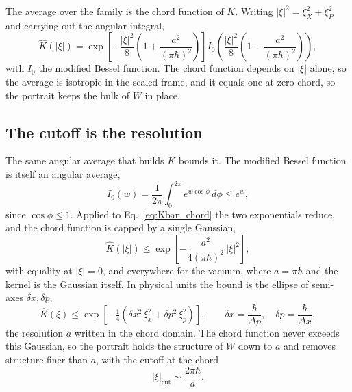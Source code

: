 \documentclass[%
  aps, amsmath, amssymb, onecolumn, 11pt
]{revtex4-2}
\begin{document}
The average over the family is the chord function of $K$. Writing
$|\xi|^2 = \xi_X^2 + \xi_P^2$ and carrying out the angular integral,
\begin{equation}
\widehat{K}(|\xi|)
= \exp\!\left[-\frac{|\xi|^2}{8}\!
\left(1 + \frac{a^2}{(\pi\hbar)^2}\right)\right]
I_0\!\left(\frac{|\xi|^2}{8}\!
\left(1 - \frac{a^2}{(\pi\hbar)^2}\right)\right),
\label{eq:Kbar_chord}
\end{equation}
with $I_0$ the modified Bessel function. The chord function depends on
$|\xi|$ alone, so the average is isotropic in the scaled frame, and it
equals one at zero chord, so the portrait keeps the bulk of $W$ in place.

\subsection{The cutoff is the resolution}
\label{sec:cutoff}

The same angular average that builds $K$ bounds it. The modified
Bessel function is itself an angular average,
\begin{equation}
I_0(w) = \frac{1}{2\pi}\int_0^{2\pi} e^{w\cos\phi}\,d\phi \le e^{w},
\label{eq:bessel_bound}
\end{equation}
since $\cos\phi \le 1$. Applied to Eq.~\eqref{eq:Kbar_chord} the two
exponentials reduce, and the chord function is capped by a single
Gaussian,
\begin{equation}
\widehat{K}(|\xi|) \le
\exp\!\left[-\frac{a^2}{4(\pi\hbar)^2}\,|\xi|^2\right],
\label{eq:Kbar_bound}
\end{equation}
with equality at $|\xi| = 0$, and everywhere for the vacuum, where
$a = \pi\hbar$ and the kernel is the Gaussian itself. In physical
units the bound is the ellipse of semi-axes $\delta x, \delta p$,
\begin{equation}
\widehat{K}(\xi) \le
\exp\!\left[-\tfrac14\!\left(\delta x^2\,\xi_x^2
+ \delta p^2\,\xi_p^2\right)\right],
\qquad
\delta x = \frac{\hbar}{\Delta p}, \quad \delta p = \frac{\hbar}{\Delta x},
\label{eq:physical_envelope}
\end{equation}
the resolution $a$ written in the chord domain. The chord function
never exceeds this Gaussian, so the portrait holds the structure of $W$
down to $a$ and removes structure finer than $a$, with the
cutoff at the chord
\begin{equation}
|\xi|_{\mathrm{cut}} \sim \frac{2\pi\hbar}{a}.
\label{eq:cutoff}
\end{equation}
\end{document}
